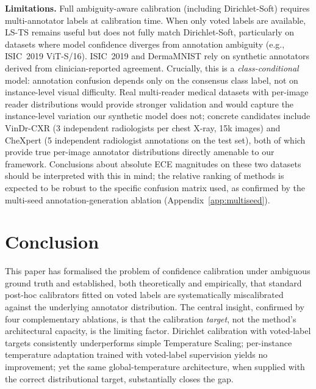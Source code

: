 \documentclass[10pt,journal,compsoc]{IEEEtran}
\begin{document}
\noindent\textbf{Limitations.}
Full ambiguity-aware calibration (including Dirichlet-Soft) requires multi-annotator labels at calibration time.  When only voted labels are available, LS-TS remains useful but does not fully match Dirichlet-Soft, particularly on datasets where model confidence diverges from annotation ambiguity (e.g., ISIC~2019 ViT-S/16).  ISIC~2019 and DermaMNIST rely on synthetic annotators derived from clinician-reported agreement.  Crucially, this is a \emph{class-conditional} model: annotation confusion depends only on the consensus class label, not on instance-level visual difficulty.  Real multi-reader medical datasets with per-image reader distributions would provide stronger validation and would capture the instance-level variation our synthetic model does not; concrete candidates include VinDr-CXR \cite{nguyen2022vindr} (3 independent radiologists per chest X-ray, 15k images) and CheXpert \cite{irvin2019chexpert} (5 independent radiologist annotations on the test set), both of which provide true per-image annotator distributions directly amenable to our framework.  Conclusions about absolute ECE magnitudes on these two datasets should be interpreted with this in mind; the relative ranking of methods is expected to be robust to the specific confusion matrix used, as confirmed by the multi-seed annotation-generation ablation (Appendix~\ref{app:multiseed}).

\section{Conclusion}
\label{sec:conclusion}

This paper has formalised the problem of confidence calibration under ambiguous ground truth and established, both theoretically and empirically, that standard post-hoc calibrators fitted on voted labels are systematically miscalibrated against the underlying annotator distribution.  The central insight, confirmed by four complementary ablations, is that the calibration \emph{target}, not the method's architectural capacity, is the limiting factor.  Dirichlet calibration with voted-label targets consistently underperforms simple Temperature Scaling; per-instance temperature adaptation trained with voted-label supervision yields no improvement; yet the same global-temperature architecture, when supplied with the correct distributional target, substantially closes the gap.
\end{document}
